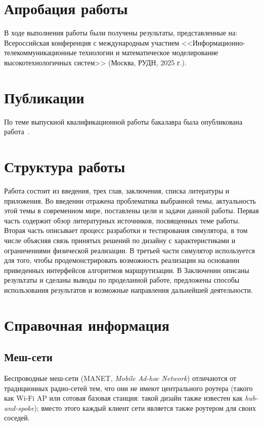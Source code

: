 \documentclass[%
]{report}
\begin{document}
\section{Апробация работы}

В ходе выполнения работы были получены результаты, представленные на:
Всероссийская конференция с международным участием
<<Информационно-телекоммуникационные технологии и математическое моделирование высокотехнологичных систем>> (Москва, РУДН, 2025 г.).


\section{Публикации}

По теме выпускной квалификационной работы бакалавра была опубликована работа~\cite{ittmm}.

\section{Структура работы}

Работа состоит из введения, трех глав, заключения, списка литературы и
приложения.
Во введении отражена проблематика выбранной темы, актуальность этой темы в современном мире, поставлены цели и задачи данной работы.
Первая часть содержит обзор литературных источников, посвященных теме работы.
Вторая часть описывает процесс разработки и тестирования симулятора,
в том числе объясняя связь принятых решений по дизайну с характеристиками и ограничениями физической реализации.
В третьей части симулятор используется для того, чтобы продемонстрировать возможность
реализации на основании приведенных интерфейсов алгоритмов маршрутизации.
В Заключении описаны результаты и сделаны выводы по проделанной работе,
предложены способы использования результатов и возможные направления дальнейшей деятельности.

\section{Справочная информация}


\subsection{Меш-сети}
Беспроводные меш-сети (MANET, \emph{Mobile Ad-hoc Network})
отличаются от традиционных радио-сетей тем,
что они не имеют центрального роутера (такого как Wi-Fi AP или сотовая базовая станция: такой дизайн также известен как \emph{hub-and-spoke});
вместо этого каждый клиент сети является также роутером для своих соседей.
\end{document}
